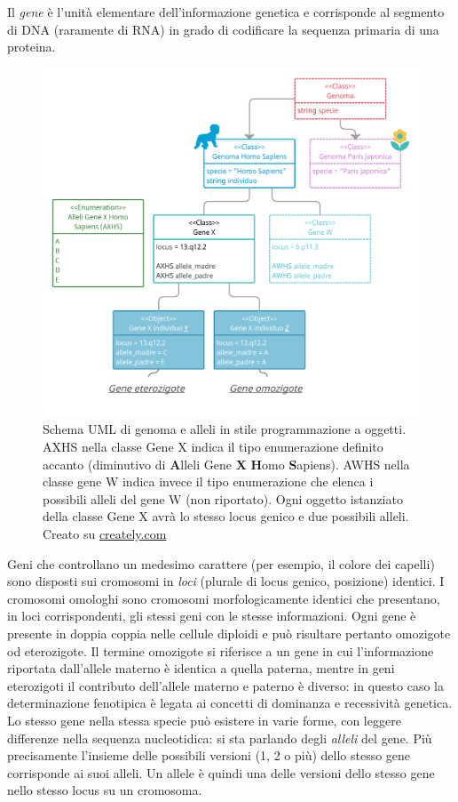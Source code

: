 Il \textit{gene} è l'unità elementare dell'informazione genetica e corrisponde al segmento di DNA (raramente di RNA) in grado di codificare la sequenza primaria di una proteina.  

 \begin{figure}[h]
	\centering
	\includegraphics[scale=0.25]{images/alleli-uml.png}
	\caption{Schema UML di genoma e alleli in stile programmazione a oggetti. AXHS nella classe Gene X indica il tipo enumerazione definito accanto (diminutivo di \textbf{A}lleli Gene \textbf{X} \textbf{H}omo \textbf{S}apiens). AWHS nella classe gene W indica invece il tipo enumerazione che elenca i possibili alleli del gene W (non riportato). Ogni oggetto istanziato della classe Gene X avrà lo stesso locus genico e due possibili alleli. Creato su \href{https://creately.com}{creately.com}}
	\label{fig:alleli-uml}
\end{figure}

Geni che controllano un medesimo carattere (per esempio, il colore dei capelli) sono disposti sui cromosomi in \textit{loci} (plurale di locus genico, posizione) identici. I cromosomi omologhi sono cromosomi morfologicamente identici che presentano, in loci corrispondenti, gli stessi geni con le stesse informazioni. Ogni gene è presente in doppia coppia nelle cellule diploidi e può risultare pertanto omozigote od eterozigote.  Il termine omozigote si riferisce a un gene in cui l'informazione riportata dall'allele materno è identica a quella paterna, mentre in geni eterozigoti il contributo dell'allele materno e paterno è diverso: in questo caso la determinazione fenotipica è legata ai concetti di dominanza e recessività genetica. Lo stesso gene nella stessa specie può esistere in varie forme, con leggere differenze nella sequenza nucleotidica: si sta parlando degli \textit{alleli} del gene. Più precisamente l'insieme delle possibili versioni (1, 2 o più) dello stesso gene corrisponde ai suoi alleli. Un allele è quindi una delle versioni dello stesso gene nello stesso locus su un cromosoma.


